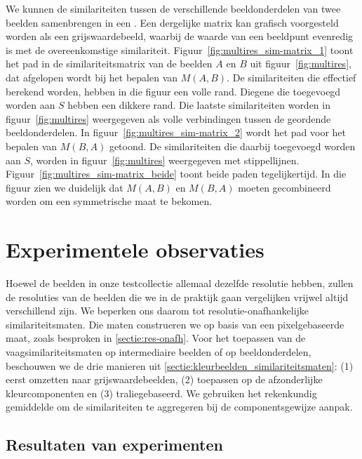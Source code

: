 We kunnen de similariteiten tussen de verschillende beeldonderdelen van twee beelden
samenbrengen in een . Een dergelijke matrix kan grafisch 
voorgesteld worden als een grijswaardebeeld, waarbij de waarde van een beeldpunt evenredig is met
de overeenkomstige similariteit. Figuur~\ref{fig:multires_sim-matrix_1} toont het pad in de 
similariteitsmatrix van de beelden $A$ en $B$ uit figuur~\ref{fig:multires}, dat afgelopen wordt
bij het bepalen van $M(A,B)$.
De similariteiten die effectief berekend worden, hebben in die figuur een volle rand. Diegene 
die toegevoegd worden aan $S$ hebben een dikkere rand. Die laatste similariteiten 
worden in figuur~\ref{fig:multires} weergegeven als volle verbindingen tussen de
geordende beeldonderdelen. In figuur~\ref{fig:multires_sim-matrix_2} wordt het
pad voor het bepalen van $M(B,A)$ getoond. De similariteiten die daarbij toegevoegd 
worden aan $S$, worden in figuur~\ref{fig:multires} weergegeven met stippellijnen.
Figuur~\ref{fig:multires_sim-matrix_beide} toont beide paden tegelijkertijd. In die 
figuur zien we duidelijk dat $M(A,B)$ en $M(B,A)$ moeten gecombineerd worden
om een symmetrische maat te bekomen.


\section{Experimentele observaties}

Hoewel de beelden in onze testcollectie allemaal dezelfde resolutie hebben, zullen de
resoluties van de beelden die we in de praktijk gaan vergelijken vrijwel altijd verschillend zijn.
We beperken ons daarom tot resolutie-onafhankelijke similariteitsmaten. Die maten construeren
we op basis van een pixelgebaseerde maat, zoals besproken in \ref{sectie:res-onafh}. 
Voor het toepassen van de vaagsimilariteitsmaten op
intermediaire beelden of op beeldonderdelen, beschouwen we de drie manieren uit \ref{sectie:kleurbeelden_similariteitsmaten}:
(1) eerst omzetten naar grijswaardebeelden, 
(2) toepassen op de afzonderlijke kleurcomponenten en 
(3) traliegebaseerd. We gebruiken het rekenkundig gemiddelde om de similariteiten te 
aggregeren bij de componentsgewijze aanpak.

\subsection{Resultaten van experimenten}

